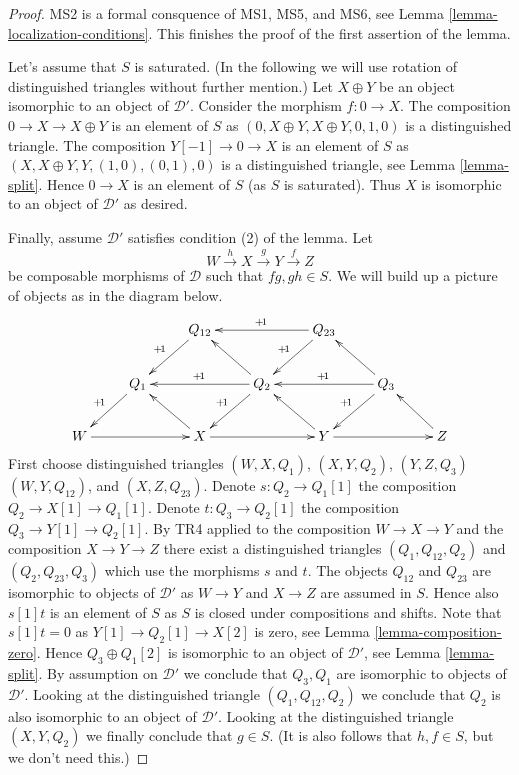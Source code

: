 \begin{proof}
\medskip\noindent
MS2 is a formal consquence of MS1, MS5, and MS6, see
Lemma \ref{lemma-localization-conditions}.
This finishes the proof of the first assertion of the lemma.

\medskip\noindent
Let's assume that $S$ is saturated. (In the following we will use
rotation of distinguished triangles without further mention.)
Let $X \oplus Y$ be an object isomorphic to an object of $\mathcal{D}'$.
Consider the morphism $f : 0 \to X$. The composition
$0 \to X \to X \oplus Y$ is an element
of $S$ as $(0, X \oplus Y, X \oplus Y, 0, 1, 0)$ is a distinguished
triangle. The composition $Y[-1] \to 0 \to X$ is an element of $S$
as $(X, X \oplus Y, Y, (1, 0), (0, 1), 0)$ is a distinguished triangle, see
Lemma \ref{lemma-split}.
Hence $0 \to X$ is an element of $S$ (as $S$ is saturated).
Thus $X$ is isomorphic to an object of $\mathcal{D}'$ as desired.

\medskip\noindent
Finally, assume $\mathcal{D}'$ satisfies condition (2) of the lemma.
Let
$$
W \xrightarrow{h}
X \xrightarrow{g}
Y \xrightarrow{f} Z
$$
be composable morphisms of $\mathcal{D}$ such that $fg, gh \in S$.
We will build up a picture of objects as in the diagram below.
$$
\xymatrix{
 & &
Q_{12} \ar[ld]_{\!+\!1} & &
Q_{23} \ar[ld]_{\!+\!1} \ar[ll]_{\!+\!1} \\
 &
Q_1 \ar[ld]_{\!+\!1} & &
Q_2 \ar[ld]_{\!+\!1} \ar[ll]_{\!+\!1} \ar[lu] & &
Q_3 \ar[ld]_{\!+\!1} \ar[ll]_{\!+\!1} \ar[lu] \\
W \ar[rr] & &
X \ar[lu] \ar[rr] & &
Y \ar[lu] \ar[rr] & &
Z \ar[lu]
}
$$
First choose distinguished triangles
$(W, X, Q_1)$, $(X, Y, Q_2)$, $(Y, Z, Q_3)$ $(W, Y, Q_{12})$, and
$(X, Z, Q_{23})$. Denote $s : Q_2 \to Q_1[1]$ the composition
$Q_2 \to X[1] \to Q_1[1]$. Denote $t : Q_3 \to Q_2[1]$ the
composition $Q_3 \to Y[1] \to Q_2[1]$.
By TR4 applied to the composition $W \to X \to Y$
and the composition $X \to Y \to Z$ there exist
a distinguished triangles $(Q_1, Q_{12}, Q_2)$ and $(Q_2, Q_{23}, Q_3)$
which use the morphisms $s$ and $t$.
The objects $Q_{12}$ and $Q_{23}$ are isomorphic to objects of
$\mathcal{D}'$ as $W \to Y$ and $X \to Z$ are assumed in $S$.
Hence also $s[1]t$ is an element of $S$ as $S$ is closed under compositions
and shifts.
Note that $s[1]t = 0$ as $Y[1] \to Q_2[1] \to X[2]$ is zero, see
Lemma \ref{lemma-composition-zero}.
Hence $Q_3 \oplus Q_1[2]$ is isomorphic to an object of $\mathcal{D}'$, see
Lemma \ref{lemma-split}.
By assumption on $\mathcal{D}'$ we conclude that $Q_3, Q_1$ are isomorphic
to objects of $\mathcal{D}'$. Looking at the distinguished triangle
$(Q_1, Q_{12}, Q_2)$ we conclude that $Q_2$ is also isomorphic to
an object of $\mathcal{D}'$. Looking at the distinguished triangle
$(X, Y, Q_2)$ we finally conclude that $g \in S$. (It is also
follows that $h, f \in S$, but we don't need this.)
\end{proof}






